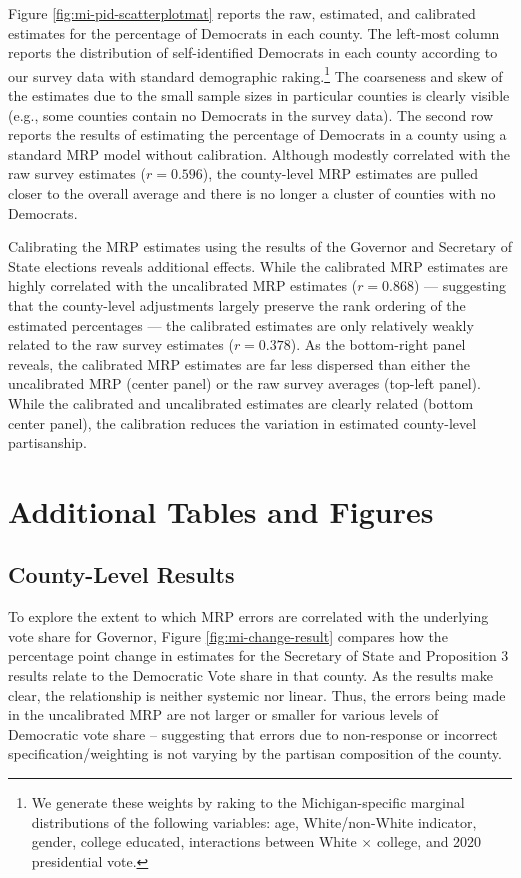 Figure \ref{fig:mi-pid-scatterplotmat} reports the raw, estimated, and calibrated estimates for the percentage of Democrats in each county.
The left-most column reports the distribution of self-identified Democrats in each county according to our survey data with standard demographic raking.\footnote{We generate these weights by raking to the Michigan-specific marginal distributions of the following variables: age, White/non-White indicator, gender, college educated, interactions between White $\times$ college, and 2020 presidential vote.} 
The coarseness and skew of the estimates due to the small sample sizes in particular counties is clearly visible (e.g., some counties contain no Democrats in the survey data).
The second row reports the results of estimating the percentage of Democrats in a county using a standard MRP model without calibration.
Although modestly correlated with the raw survey estimates ($r =0.596$), the county-level MRP estimates are pulled closer to the overall average and there is no longer a cluster of counties with no Democrats.

Calibrating the MRP estimates using the results of the Governor and Secretary of State elections reveals additional effects. 
While the calibrated MRP estimates are highly correlated with the uncalibrated MRP estimates ($r = 0.868$) --- suggesting that the county-level adjustments largely preserve the rank ordering of the estimated percentages --- the calibrated estimates are only relatively weakly related to the raw survey estimates ($r=0.378$).
As the bottom-right panel reveals, the calibrated MRP estimates are far less dispersed than either the uncalibrated MRP (center panel) or the raw survey averages (top-left panel).
While the calibrated and uncalibrated estimates are clearly related (bottom center panel), the calibration reduces the variation in estimated county-level partisanship.

\clearpage
\section{Additional Tables and Figures}
\label{apx:addl_tables}

\subsection{County-Level Results}

To explore the extent to which MRP errors are correlated with the underlying vote share for Governor, Figure \ref{fig:mi-change-result} compares how the percentage point change in estimates for the Secretary of State and Proposition 3 results relate to the Democratic Vote share in that county.  As the results make clear, the relationship is neither systemic nor linear.  Thus, the errors being made in the uncalibrated MRP are not larger or smaller for various levels of Democratic vote share -- suggesting that errors due to non-response or incorrect specification/weighting is not varying by the partisan composition of the county.




